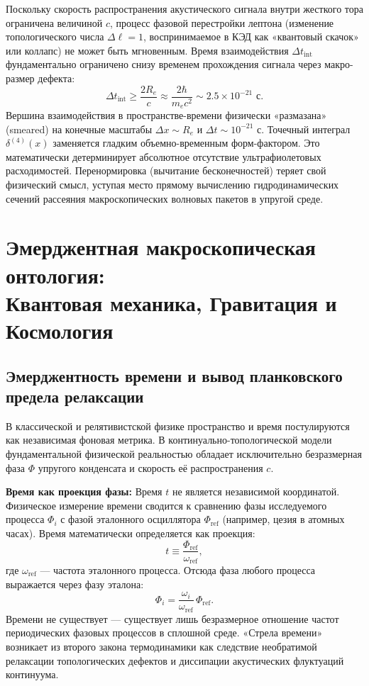 \documentclass[11pt,a4paper]{article}
\begin{document}
	Поскольку скорость распространения акустического сигнала внутри жесткого тора ограничена величиной $c$, процесс фазовой перестройки лептона (изменение топологического числа $\Delta \ell = 1$, воспринимаемое в КЭД как «квантовый скачок» или коллапс) не может быть мгновенным. Время взаимодействия $\Delta t_{\text{int}}$ фундаментально ограничено снизу временем прохождения сигнала через макро-размер дефекта:
	\begin{equation}
		\Delta t_{\text{int}} \ge \frac{2 R_e}{c} \approx \frac{2 \hbar}{m_e c^2} \sim 2.5 \times 10^{-21} \text{ с}.
	\end{equation}
	Вершина взаимодействия в пространстве-времени физически «размазана» (smeared) на конечные масштабы $\Delta x \sim R_e$ и $\Delta t \sim 10^{-21}$ с. Точечный интеграл $\delta^{(4)}(x)$ заменяется гладким объемно-временным форм-фактором. Это математически детерминирует абсолютное отсутствие ультрафиолетовых расходимостей. 
	Перенормировка (вычитание бесконечностей) теряет свой физический смысл, уступая место прямому вычислению гидродинамических сечений рассеяния макроскопических волновых пакетов в упругой среде.
	
	\section{Эмерджентная макроскопическая онтология:\\ Квантовая механика, Гравитация и Космология}
	
	\subsection{Эмерджентность времени и вывод планковского предела релаксации}
	
	В классической и релятивистской физике пространство и время постулируются как независимая фоновая метрика. В континуально-топологической модели фундаментальной физической реальностью обладает исключительно безразмерная фаза $\Phi$ упругого конденсата и скорость её распространения $c$.
	
	\textbf{Время как проекция фазы:}
	Время $t$ не является независимой координатой. Физическое измерение времени сводится к сравнению фазы исследуемого процесса $\Phi_i$ с фазой эталонного осциллятора $\Phi_{\text{ref}}$ (например, цезия в атомных часах). Время математически определяется как проекция:
	\begin{equation}
		t \equiv \frac{\Phi_{\text{ref}}}{\omega_{\text{ref}}},
	\end{equation}
	где $\omega_{\text{ref}}$ — частота эталонного процесса. Отсюда фаза любого процесса выражается через фазу эталона:
	\begin{equation}
		\Phi_i = \frac{\omega_i}{\omega_{\text{ref}}}\, \Phi_{\text{ref}}.
	\end{equation}
	Времени не существует — существует лишь безразмерное отношение частот периодических фазовых процессов в сплошной среде. «Стрела времени» возникает из второго закона термодинамики как следствие необратимой релаксации топологических дефектов и диссипации акустических флуктуаций континуума.
	
\end{document}
